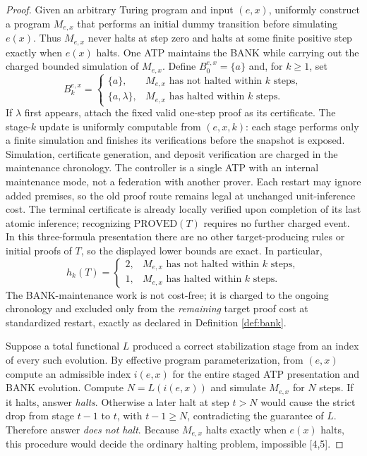 \documentclass[11pt]{article}
\theoremstyle{definition}
\newcommand{\PROVED}{\mathrm{PROVED}}
\begin{document}
\begin{proof}
Given an arbitrary Turing program and input $(e,x)$, uniformly construct a program $M_{e,x}$ that performs an initial dummy transition before simulating $e(x)$. Thus $M_{e,x}$ never halts at step zero and halts at some finite positive step exactly when $e(x)$ halts. One ATP maintains the BANK while carrying out the charged bounded simulation of $M_{e,x}$. Define $B_0^{e,x}=\{a\}$ and, for $k\ge1$, set
\[
B_k^{e,x}=\begin{cases}
\{a\},&M_{e,x}\text{ has not halted within }k\text{ steps},\\
\{a,\lambda\},&M_{e,x}\text{ has halted within }k\text{ steps}.
\end{cases}
\]
If $\lambda$ first appears, attach the fixed valid one-step proof as its certificate. The stage-$k$ update is uniformly computable from $(e,x,k)$: each stage performs only a finite simulation and finishes its verifications before the snapshot is exposed. Simulation, certificate generation, and deposit verification are charged in the maintenance chronology. The controller is a single ATP with an internal maintenance mode, not a federation with another prover. Each restart may ignore added premises, so the old proof route remains legal at unchanged unit-inference cost. The terminal certificate is already locally verified upon completion of its last atomic inference; recognizing $\PROVED(T)$ requires no further charged event. In this three-formula presentation there are no other target-producing rules or initial proofs of $T$, so the displayed lower bounds are exact. In particular,
\[
h_k(T)=\begin{cases}
2,&M_{e,x}\text{ has not halted within }k\text{ steps},\\
1,&M_{e,x}\text{ has halted within }k\text{ steps}.
\end{cases}
\]
The BANK-maintenance work is not cost-free; it is charged to the ongoing chronology and excluded only from the \emph{remaining} target proof cost at standardized restart, exactly as declared in Definition \ref{def:bank}.

Suppose a total functional $L$ produced a correct stabilization stage from an index of every such evolution. By effective program parameterization, from $(e,x)$ compute an admissible index $i(e,x)$ for the entire staged ATP presentation and BANK evolution. Compute $N=L(i(e,x))$ and simulate $M_{e,x}$ for $N$ steps. If it halts, answer \emph{halts}. Otherwise a later halt at step $t>N$ would cause the strict drop from stage $t-1$ to $t$, with $t-1\ge N$, contradicting the guarantee of $L$. Therefore answer \emph{does not halt}. Because $M_{e,x}$ halts exactly when $e(x)$ halts, this procedure would decide the ordinary halting problem, impossible [4,5].
\end{proof}
\end{document}
